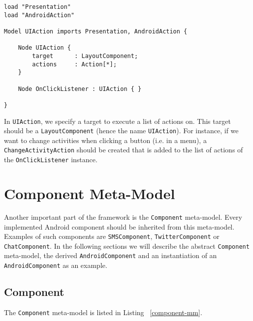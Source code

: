 \begin{lstlisting}[label=uiaction-mm,caption=UIAction meta-model, captionpos=t]
load "Presentation"
load "AndroidAction"

Model UIAction imports Presentation, AndroidAction {
	
	Node UIAction {
		target 		: LayoutComponent;
		actions 	: Action[*];
	}

	Node OnClickListener : UIAction { }

}
\end{lstlisting}
In \texttt{UIAction}, we specify a target to execute a list of actions on. This target should be a \texttt{LayoutComponent} (hence the name \texttt{UIAction}). For instance, if we want to change activities when clicking a button (i.e. in a menu), a \texttt{ChangeActivityAction} should be created that is added to the list of actions of the \texttt{OnClickListener} instance.

\section{Component Meta-Model}

Another important part of the framework is the \texttt{Component} meta-model. Every implemented Android component should be inherited from this meta-model. Examples of such components are \texttt{SMSComponent}, \texttt{TwitterComponent} or \texttt{ChatComponent}. In the following sections we will describe the abstract \texttt{Component} meta-model, the derived \texttt{AndroidComponent} and an instantiation of an \texttt{AndroidComponent} as an example.

\subsection{Component}

The \texttt{Component} meta-model is listed in Listing ~\ref{component-mm}.

